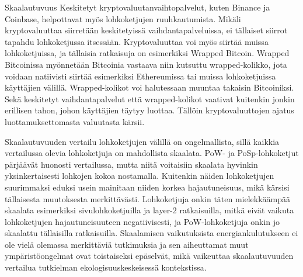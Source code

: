 \begin{section}{Skaalautuvuus\label{skaalautuvuus}}
Keskitetyt kryptovaluutanvaihtopalvelut, kuten Binance ja Coinbase, helpottavat myös lohkoketjujen ruuhkautumista. Mikäli kryptovaluuttaa siirretään keskitetyissä vaihdantapalveluissa, ei tällaiset siirrot tapahdu lohkoketjussa itsessään. Kryptovaluuttaa voi myös siirtää muissa lohkoketjuissa, ja tällaisia ratkaisuja on esimerkiksi Wrapped Bitcoin. Wrapped Bitcoinissa myönnetään Bitcoinia vastaava niin kutsuttu wrapped-kolikko, jota voidaan natiivisti siirtää esimerkiksi Ethereumissa tai muissa lohkoketjuissa käyttäjien välillä. Wrapped-kolikot voi halutessaan muuntaa takaisin Bitcoiniksi. Sekä keskitetyt vaihdantapalvelut että wrapped-kolikot vaativat kuitenkin jonkin erillisen tahon, johon käyttäjien täytyy luottaa. Tällöin kryptovaluuttojen ajatus luottamuksettomasta valuutasta kärsii.

Skaalautuvuuden vertailu lohkoketjujen välillä on ongelmallista, sillä kaikkia vertailussa olevia lohkoketjuja on mahdollista skaalata. PoW- ja PoSp-lohkoketjut pärjäävät huonosti vertailussa, mutta niitä voitaisiin skaalata hyvinkin yksinkertaisesti lohkojen kokoa nostamalla. Kuitenkin näiden lohkoketjujen suurimmaksi eduksi usein mainitaan niiden korkea hajautuneisuus, mikä kärsisi tällaisesta muutoksesta merkittävästi. Lohkoketjuja onkin täten mielekkäämpää skaalata esimerkiksi sivulohkoketjuilla ja layer-2 ratkaisuilla, mitkä eivät vaikuta lohkoketjujen hajautuneisuuteen negatiivisesti, ja PoW-lohkoketjuja onkin jo skaalattu tällaisilla ratkaisuilla. Skaalamisen vaikutuksista energiankulutukseen ei ole vielä olemassa merkittäviä tutkimuksia ja sen aiheuttamat muut ympäristöongelmat ovat toistaiseksi epäselvät, mikä vaikeuttaa skaalautuvuuden vertailua tutkielman ekologisuuskeskeisessä kontekstissa.

\end{section}
